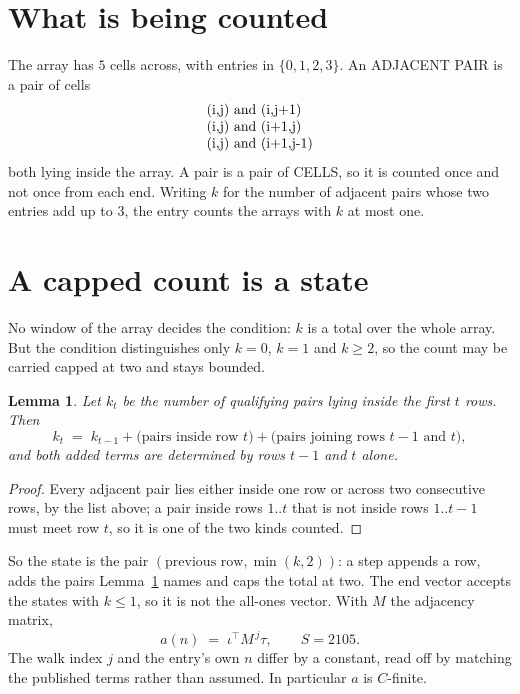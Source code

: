 \documentclass[11pt,a4paper]{article}
\theoremstyle{plain}
\newtheorem{lemma}[theorem]{Lemma}
\theoremstyle{definition}
\begin{document}
\section{What is being counted}

The array has $5$ cells across, with entries in $\{0,1,2,3\}$. An ADJACENT PAIR is a pair of cells
\[
\begin{array}{l}
$(i,j)\text{ and }(i,j{+}1)$ \\
$(i,j)\text{ and }(i{+}1,j)$ \\
$(i,j)\text{ and }(i{+}1,j{-}1)$ \\
\end{array}
\]
both lying inside the array. A pair is a pair of CELLS, so it is counted once and not once from
each end. Writing $k$ for the number of adjacent pairs whose two entries add up to $3$, the
entry counts the arrays with $k$ at most one.

\section{A capped count is a state}

No window of the array decides the condition: $k$ is a total over the whole array. But the
condition distinguishes only $k=0$, $k=1$ and $k\ge2$, so the count may be carried capped at
two and stays bounded.

\begin{lemma}\label{lem:cap}
Let $k_t$ be the number of qualifying pairs lying inside the first $t$ rows. Then
\[
k_{t}\;=\;k_{t-1}+\bigl(\text{pairs inside row } t\bigr)
+\bigl(\text{pairs joining rows } t-1 \text{ and } t\bigr),
\]
and both added terms are determined by rows $t-1$ and $t$ alone.
\end{lemma}

\begin{proof}
Every adjacent pair lies either inside one row or across two consecutive rows, by the list
above; a pair inside rows $1..t$ that is not inside rows $1..t-1$ must meet row $t$, so it is
one of the two kinds counted.
\end{proof}

So the state is the pair $(\text{previous row},\min(k,2))$: a step appends a row, adds the
pairs Lemma~\ref{lem:cap} names and caps the total at two. The end vector accepts the states
with $k\le1$, so it is not the all-ones vector. With $M$ the adjacency matrix,
\[
a(n)\;=\;\iota^{\!\top}M^{\,j}\tau ,\qquad S=2105.
\]
The walk index $j$ and the entry's own $n$ differ by a constant, read off by matching the
published terms rather than assumed. In particular $a$ is $C$-finite.
\end{document}
